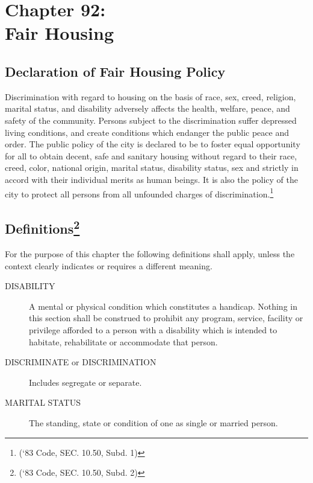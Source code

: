 \chapter*{Chapter 92: \\
	Fair Housing}
    \minitoc
    \pagebreak

\section{Declaration of Fair Housing Policy}
Discrimination with regard to housing on the basis of race, sex, creed, religion, marital status, and disability adversely affects the health, welfare, peace, and safety of the community.  Persons subject to the discrimination suffer depressed living conditions, and create conditions which endanger the public peace and order. The public policy of the city is declared to be to foster equal opportunity for all to obtain decent, safe and sanitary housing without regard to their race, creed, color, national origin, marital status, disability status, sex and strictly in accord with their individual merits as human beings. It is also the policy of the city to protect all persons from all unfounded charges of discrimination.\footnote{(‘83 Code, SEC. 10.50, Subd. 1)}
\section{Definitions\footnote{(‘83 Code, SEC. 10.50, Subd. 2)}}
For the purpose of this chapter the following definitions shall apply, unless the context clearly indicates or requires a different meaning.
\begin{description}
    \item[DISABILITY] A mental or physical condition which constitutes a handicap.  Nothing in this section shall be construed to prohibit any program, service, facility or privilege afforded to a person with a disability which is intended to habitate, rehabilitate or accommodate that person.
    \item[DISCRIMINATE or DISCRIMINATION] Includes segregate or separate.
    \item[MARITAL STATUS] The standing, state or condition of one as single or married person.
\end{description}

